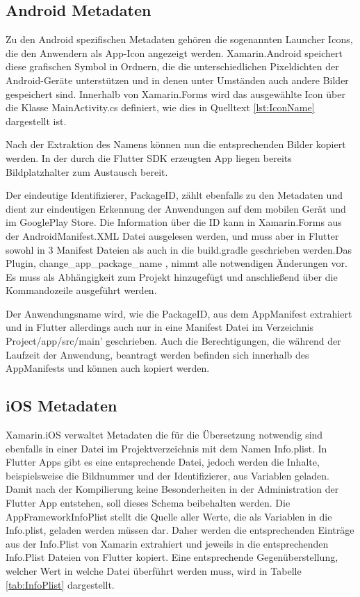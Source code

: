 \subsection{Android Metadaten}
Zu den Android spezifischen Metadaten gehören die sogenannten Launcher Icons, die den Anwendern als App-Icon angezeigt werden. Xamarin.Android speichert diese grafischen Symbol in Ordnern, die die unterschiedlichen Pixeldichten der Android-Geräte unterstützen und in denen unter Umständen auch andere Bilder gespeichert sind.  Innerhalb von Xamarin.Forms wird das ausgewählte Icon über die Klasse MainActivity.cs definiert, wie dies in Quelltext \ref{lst:IconName} dargestellt ist. 



Nach der Extraktion des Namens können nun die entsprechenden Bilder kopiert werden.  In der durch die Flutter SDK erzeugten App liegen bereits Bildplatzhalter zum Austausch bereit.

Der eindeutige Identifizierer,  PackageID,  zählt ebenfalls zu den Metadaten und dient zur eindeutigen Erkennung der Anwendungen auf dem mobilen Gerät und im GooglePlay Store.  Die Information über die ID kann in Xamarin.Forms aus der AndroidManifest.XML Datei ausgelesen  werden, und muss aber in Flutter sowohl in 3 Manifest Dateien als auch in die build.gradle geschrieben werden.Das Plugin,  change\_app\_package\_name , nimmt alle notwendigen Änderungen vor. Es muss als Abhängigkeit zum Projekt hinzugefügt und anschließend über die Kommandozeile ausgeführt werden. 

Der Anwendungsname wird, wie die PackageID, aus dem AppManifest extrahiert und in Flutter allerdings auch nur in eine Manifest Datei im Verzeichnis Project/app/src/main’ geschrieben.  Auch die Berechtigungen, die während der Laufzeit der Anwendung, beantragt werden befinden sich innerhalb des AppManifests und können auch kopiert werden.

\subsection{iOS Metadaten}
Xamarin.iOS verwaltet Metadaten die für die Übersetzung notwendig sind ebenfalls in einer Datei im Projektverzeichnis mit dem Namen Info.plist.  In Flutter Apps gibt es eine entsprechende Datei,  jedoch werden die Inhalte,  beispielsweise die Bildnummer und der Identifizierer,  aus Variablen geladen.  Damit nach der Kompilierung keine Besonderheiten in der Administration der Flutter App entstehen,  soll dieses Schema beibehalten werden.  Die AppFrameworkInfoPlist stellt die Quelle aller Werte,  die als Variablen in die Info.plist, geladen werden müssen dar.   Daher werden die entsprechenden Einträge aus der Info.Plist von Xamarin extrahiert und jeweils in die entsprechenden Info.Plist Dateien von Flutter kopiert.  Eine entsprechende Gegenüberstellung, welcher Wert in welche Datei überführt werden muss,  wird in Tabelle \ref{tab:InfoPlist} dargestellt. 


